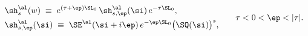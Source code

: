 \begin{equation}\label{euclfield}
\begin{aligned}
{}& \sh_s^{\al}(w)\;\equiv\;e^{(\tau+\ep)\SL_0}\,\sh_{s,\ep}^{\al}(\si)\,
e^{-\tau \SL_0},\\
& \sh_{s,\ep}^{\al}(\si)\;\equiv\; \SE^{\al}(\si+i\ep)\,
 e^{-\ep\SL_0}\big(\SQ(\si)\big)^s,
\end{aligned}\qquad \tau<0<\ep<|\tau|.
\end{equation} 
